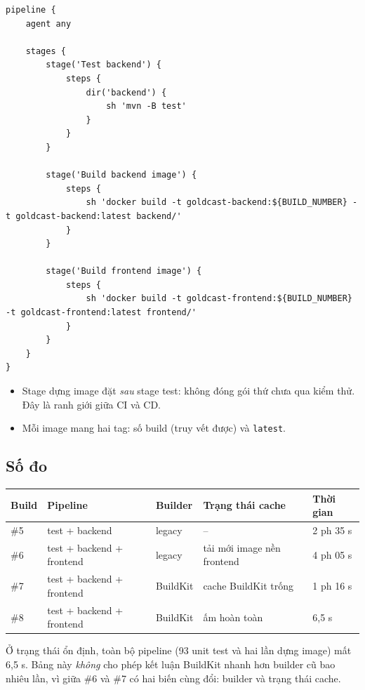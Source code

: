 \documentclass[12pt,a4paper]{article}
\begin{document}
\begin{lstlisting}[language=Jenkinsfile, caption={\texttt{Jenkinsfile} hiện tại}]
pipeline {
    agent any

    stages {
        stage('Test backend') {
            steps {
                dir('backend') {
                    sh 'mvn -B test'
                }
            }
        }

        stage('Build backend image') {
            steps {
                sh 'docker build -t goldcast-backend:${BUILD_NUMBER} -t goldcast-backend:latest backend/'
            }
        }

        stage('Build frontend image') {
            steps {
                sh 'docker build -t goldcast-frontend:${BUILD_NUMBER} -t goldcast-frontend:latest frontend/'
            }
        }
    }
}
\end{lstlisting}

\begin{itemize}
  \item Stage dựng image đặt \emph{sau} stage test: không đóng gói thứ chưa qua
        kiểm thử. Đây là ranh giới giữa CI và CD.
  \item Mỗi image mang hai tag: số build (truy vết được) và \texttt{latest}.
\end{itemize}

\subsection{Số đo}

\begin{center}
\begin{tabular}{lllll}
\toprule
Build & Pipeline & Builder & Trạng thái cache & Thời gian \\
\midrule
\#5 & test + backend            & legacy   & --                         & 2 ph 35 s \\
\#6 & test + backend + frontend & legacy   & tải mới image nền frontend & 4 ph 05 s \\
\#7 & test + backend + frontend & BuildKit & cache BuildKit trống       & 1 ph 16 s \\
\#8 & test + backend + frontend & BuildKit & ấm hoàn toàn               & 6,5 s \\
\bottomrule
\end{tabular}
\end{center}

Ở trạng thái ổn định, toàn bộ pipeline (93 unit test và hai lần dựng image) mất
6,5 s. Bảng này \emph{không} cho phép kết luận BuildKit nhanh hơn builder cũ bao
nhiêu lần, vì giữa \#6 và \#7 có hai biến cùng đổi: builder và trạng thái cache.
\end{document}
